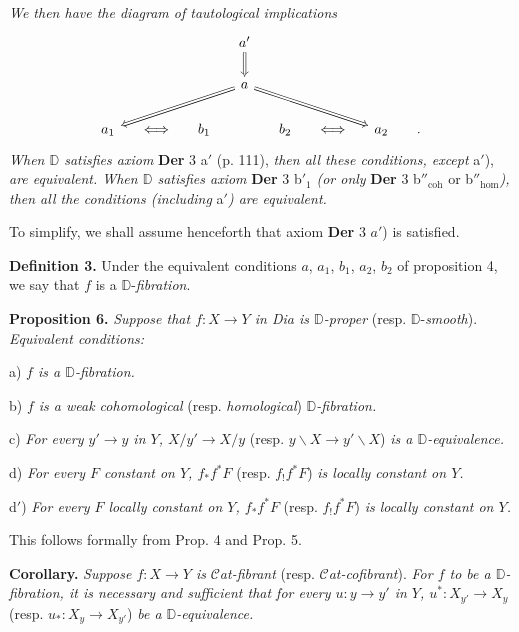 \documentclass[11pt]{article}
\newcommand{\printedpage}[1]{\marginpar{\footnotesize p.~#1}}
\newcommand{\msp}[1]{\marginpar{\footnotesize [#1]}}
\newcommand{\D}{\mathbb{D}}
\newcommand{\sfup}[1]{\textsf{\upshape #1}}
\newcommand{\Dia}{\sfup{Dia}}
\newcommand{\Cat}{$\mathcal{C}$\textit{at}}
\begin{document}
\printedpage{70}
\textit{We then have the diagram of tautological implications}
\[
\begin{tikzcd}[column sep=small]
& & & a' \arrow[d, Rightarrow] & & & & \\
& & & a \arrow[dlll, Rightarrow] \arrow[drrr, Rightarrow] & & & & \\
a_1 & \Longleftrightarrow & b_1 & & b_2 & \Longleftrightarrow & a_2 & .
\end{tikzcd}
\]
\textit{When $\D$ satisfies axiom} \textbf{Der} 3 a$'$ (p. 111), \textit{then all these conditions, except} a$'$), \textit{are equivalent. When $\D$ satisfies axiom} \textbf{Der} 3 b$'_1$ \textit{(or only} \textbf{Der} 3 b$''_{\mathrm{coh}}$ or b$''_{\mathrm{hom}}$\textit{),} \textit{then all the conditions (including} a$'$\textit{) are equivalent.}

To simplify, we shall assume henceforth that axiom \textbf{Der} 3 $a'$) is satisfied.

\textbf{Definition 3.} Under the equivalent conditions $a$, $a_1$, $b_1$, $a_2$, $b_2$ of proposition 4, we say that $f$ is a $\D$-\textit{fibration}. %

\msp{page 118}\textbf{Proposition 6.} \textit{Suppose that $f : X \to Y$ in \Dia{} is $\D$-proper} (resp. $\D$-\textit{smooth}). \textit{Equivalent conditions:}

a) \textit{$f$ is a $\D$-fibration.}

b) \textit{$f$ is a weak cohomological} (resp. \textit{homological}) \textit{$\D$-fibration.}

c) \textit{For every $y' \to y$ in $Y$, $X/y' \to X/y$} (resp. $y\backslash X \to y'\backslash X$) \textit{is a $\D$-equivalence.}

d) \textit{For every $F$ constant on $Y$, $f_*f^*F$} (resp. $f_!f^*F$) \textit{is locally constant on $Y$.}

d$'$) \textit{For every $F$ locally constant on $Y$, $f_*f^*F$} (resp. $f_!f^*F$) \textit{is locally constant on $Y$.}

This follows formally from Prop. 4 and Prop. 5.

\textbf{Corollary.} \textit{Suppose $f : X \to Y$ is} \Cat\textit{-fibrant} (resp. \Cat\textit{-cofibrant}). \textit{For $f$ to be a $\D$-fibration, it is necessary and sufficient that for every $u : y \to y'$ in $Y$, $u^* : X_{y'} \to X_y$} (resp. $u_* : X_y \to X_{y'}$) \textit{be a $\D$-equivalence.}
\end{document}
